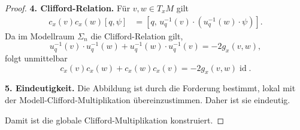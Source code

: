 \documentclass[10pt, letterpaper]{article}
\newcommand{\id}{\operatorname{id}}
\begin{document}
\begin{proof}
\noindent
\textbf{4. Clifford-Relation.}
Für $v,w\in T_xM$ gilt
\[
\begin{aligned}
c_x(v)c_x(w)[q,\psi]
&=
[q,\,u_q^{-1}(v)\cdot (u_q^{-1}(w)\cdot \psi)].
\end{aligned}
\]
Da im Modellraum $\Sigma_n$ die Clifford-Relation gilt,
\[
u_q^{-1}(v)\cdot u_q^{-1}(w)
+
u_q^{-1}(w)\cdot u_q^{-1}(v)
=
-2g_x(v,w),
\]
folgt unmittelbar
\[
c_x(v)c_x(w)+c_x(w)c_x(v)
=
-2g_x(v,w)\id.
\]

\medskip

\noindent
\textbf{5. Eindeutigkeit.}
Die Abbildung ist durch die Forderung bestimmt, lokal mit der Modell-Clifford-Multiplikation übereinzustimmen. Daher ist sie eindeutig.

\medskip

Damit ist die globale Clifford-Multiplikation konstruiert.
\end{proof}


\pagebreak
\printbibliography
\end{document}
